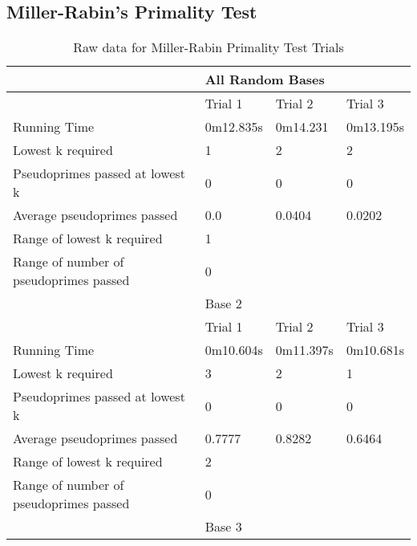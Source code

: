 \documentclass{article}
\begin{document}
\begin{appendices}
\subsection{Miller-Rabin's Primality Test}
\FloatBarrier
\begin{longtable}{llll}
\caption{Raw data for Miller-Rabin Primality Test Trials\label{table:mr}}\\ 
\toprule
                                       & \multicolumn{3}{l}{All Random Bases}   \\
\midrule
                                       & Trial 1   & Trial 2   & Trial 3        \\
Running Time                           & 0m12.835s & 0m14.231  & 0m13.195s      \\
Lowest k required                      & 1         & 2         & 2              \\
Pseudoprimes passed at lowest k        & 0         & 0         & 0              \\
Average pseudoprimes passed            & 0.0       & 0.0404    & 0.0202         \\
\cmidrule(lr){2-2}\cmidrule(lr){3-3}\cmidrule(lr){4-4}
Range of lowest k required             & \multicolumn{3}{l}{1}                  \\
Range of number of pseudoprimes passed & \multicolumn{3}{l}{0}                  \\
\midrule
                                       & \multicolumn{3}{l}{Base 2}             \\
\midrule
                                       & Trial 1   & Trial 2   & Trial 3        \\
Running Time                           & 0m10.604s & 0m11.397s & 0m10.681s      \\
Lowest k required                      & 3         & 2         & 1              \\
Pseudoprimes passed at lowest k        & 0         & 0         & 0              \\
Average pseudoprimes passed            & 0.7777    & 0.8282    & 0.6464         \\
\cmidrule(lr){2-2}\cmidrule(lr){3-3}\cmidrule(lr){4-4}
Range of lowest k required             & \multicolumn{3}{l}{2}                  \\
Range of number of pseudoprimes passed & \multicolumn{3}{l}{0}                  \\
\midrule
                                       & \multicolumn{3}{l}{Base 3}             \\

\end{longtable}
\end{appendices}
\end{document}
